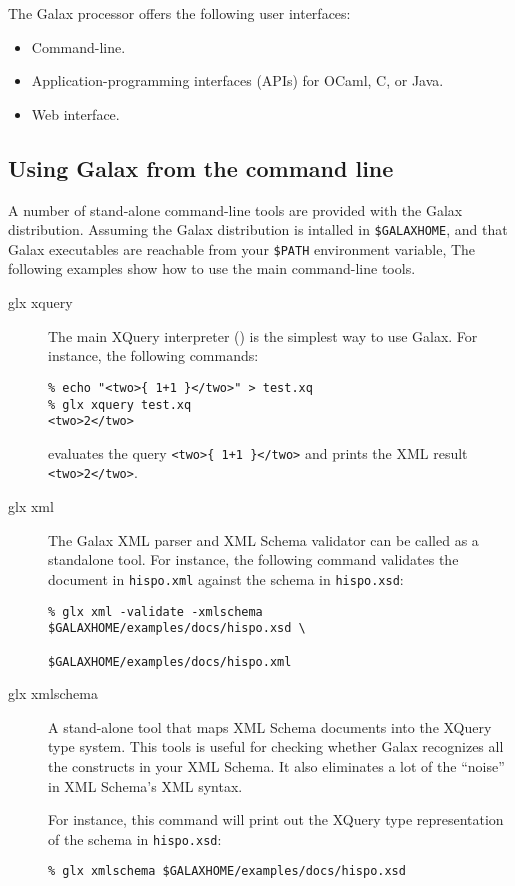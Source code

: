 The Galax processor offers the following user interfaces:

\begin{itemize}
\item Command-line.
\item Application-programming interfaces (APIs) for OCaml, C, or Java.
\item Web interface.
\end{itemize}

\subsection{Using Galax from the command line}

A number of stand-alone command-line tools are provided with the Galax
distribution. Assuming the Galax distribution is intalled in
\verb+$GALAXHOME+, and that Galax executables are reachable from your
\verb+$PATH+ environment variable, The following examples show how to
use the main command-line tools.

\begin{description}
\item[glx xquery] The main XQuery interpreter () is
  the simplest way to use Galax. For instance, the following commands:
\begin{verbatim}
% echo "<two>{ 1+1 }</two>" > test.xq
% glx xquery test.xq
<two>2</two>
\end{verbatim}
evaluates the query \verb|<two>{ 1+1 }</two>| and prints the XML
result \verb|<two>2</two>|.

\item[glx xml] The Galax XML parser and XML Schema validator can be
  called as a standalone tool. For instance, the following command
  validates the document in \texttt{hispo.xml} against the schema in
  \texttt{hispo.xsd}:
\begin{verbatim}
% glx xml -validate -xmlschema $GALAXHOME/examples/docs/hispo.xsd \
                               $GALAXHOME/examples/docs/hispo.xml 
\end{verbatim}

\item[glx xmlschema] A stand-alone tool that maps XML Schema documents into the XQuery
  type system.   This tools is useful for checking whether Galax
  recognizes all the constructs in your XML Schema.  It also eliminates a lot of the
  ``noise'' in XML Schema's XML syntax. 

For instance, this command will print out the XQuery type
representation of the schema in \texttt{hispo.xsd}: 
\begin{verbatim}
% glx xmlschema $GALAXHOME/examples/docs/hispo.xsd 
\end{verbatim}
\end{description}

